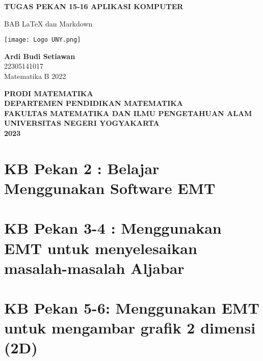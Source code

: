 \documentclass{report}
\begin{document}
\begin{titlepage}
    \begin{center}
        \vspace*{0,2cm}

        \Huge
        \textbf{TUGAS PEKAN 15-16 APLIKASI KOMPUTER}
        
        \vspace{1cm}
        
        \LARGE
        BAB LaTeX dan Markdown  
        
        \vspace{1cm}
        
        \texttt{[image: Logo UNY.png]}

        \vspace{1cm}
        
        \textbf{Ardi Budi Setiawan}\\
        22305141017\\
        Matematika B 2022
        
        \vspace{2cm}
        
        \Large
        \textbf{PRODI MATEMATIKA}\\
        \textbf{DEPARTEMEN PENDIDIKAN MATEMATIKA}\\
        \textbf{FAKULTAS MATEMATIKA DAN ILMU PENGETAHUAN ALAM}
        \textbf{UNIVERSITAS NEGERI YOGYAKARTA}\\
        \textbf{2023}
        
    \end{center}
\end{titlepage}

\newpage
\tableofcontents

\chapter{KB Pekan 2 : Belajar Menggunakan Software EMT}


\newpage
\chapter{KB Pekan 3-4 : Menggunakan EMT untuk menyelesaikan masalah-masalah Aljabar}


\newpage
\chapter{KB Pekan 5-6: Menggunakan EMT untuk mengambar grafik 2 dimensi (2D)}

\end{document}
